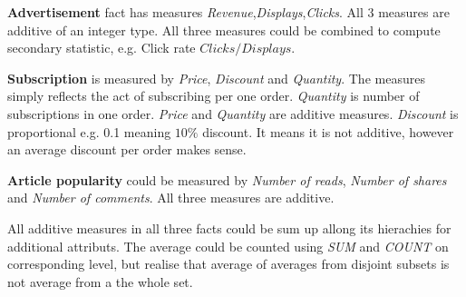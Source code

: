 

{\bf Advertisement} fact has measures {\it Revenue},{\it Displays},{\it Clicks}. All 3 measures are additive of an integer type. All three measures could be combined to compute secondary statistic, e.g. Click rate $Clicks / Displays$. 

{\bf Subscription} is measured by {\it Price}, {\it Discount} and {\it Quantity}. The measures simply reflects the act of subscribing per one order. {\it Quantity} is number of subscriptions in one order. {\it Price} and {\it Quantity} are additive measures. {\it Discount} is proportional e.g. 0.1 meaning $10\%$ discount. It means it is not additive, however an average discount per order makes sense.

{\bf Article popularity} could be measured by {\it Number of reads}, {\it Number of shares} and {\it Number of comments}.
All three measures are additive.

All additive measures in all three facts could be sum up allong its hierachies for additional attributs. The average could be counted using {\it SUM} and {\it COUNT} on corresponding level, but realise that average of averages from disjoint subsets is not average from a the whole set.
